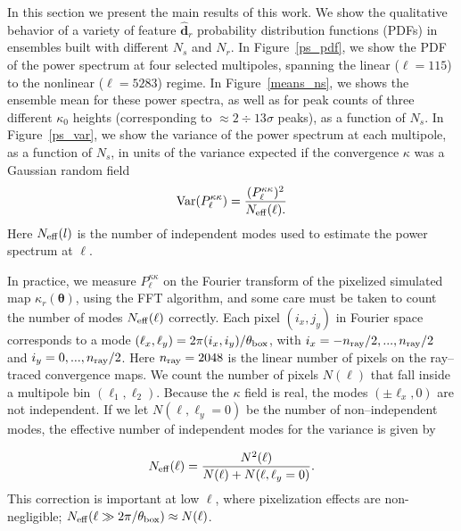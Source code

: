 \documentclass[reprint,aps,prd,superscriptaddress,showkeys,showpacs]{revtex4-1}
\newcommand{\bbh}[1]{\mathbf{\hat{#1}}}
\begin{document}

In this section we present the main results of this work. We show the
qualitative behavior of a variety of feature $\bbh{d}_r$ probability
distribution functions (PDFs) in ensembles built with different $N_s$
and $N_r$. In Figure~\ref{ps_pdf}, we show the PDF of the power
spectrum at four selected multipoles, spanning the linear ($\ell=115$)
to the nonlinear ($\ell=5283$) regime. In Figure~\ref{means_ns}, we
shows the ensemble mean for these power spectra, as well as for peak
counts of three different $\kappa_0$ heights (corresponding to
$\approx 2\div13\sigma$ peaks), as a function of $N_s$.
In Figure~\ref{ps_var}, we show the variance of the power spectrum at
each multipole, as a function of $N_s$, in units of the variance
expected if the convergence $\kappa$ was a Gaussian random field
%
\begin{equation}
\label{gaussianvar}
\mathrm{Var}(P^{\kappa\kappa}_\ell) = \frac{(P^{\kappa\kappa}_\ell)^2}{N_{\rm eff}(\ell).}
\end{equation}
%
Here $N_{\rm eff}(l)$ is the number of independent modes used to
estimate the power spectrum at $\ell$.  

In practice, we measure $P^{\kappa\kappa}_\ell$ on the Fourier
transform of the pixelized simulated map $\kappa_r(\pmb{\theta})$,
using the FFT algorithm, and some care must be taken to count the
number of modes $N_{\rm eff}(\ell)$ correctly. Each pixel $(i_x,j_y)$
in Fourier space corresponds to a mode
$(\ell_x,\ell_y)=2\pi(i_x,i_y)/\theta_{\rm box}$, with $i_x=-n_{\rm
  ray}/2,...,n_{\rm ray}/2$ and $i_y=0,...,n_{\rm ray}/2$.
Here $n_{\rm ray}=2048$ is the linear number of pixels on the
ray--traced convergence maps.  We count the number of pixels $N(\ell)$
that fall inside a multipole bin $(\ell_1,\ell_2)$. Because the
$\kappa$ field is real, the modes $(\pm \ell_x,0)$ are not
independent. If we let $N(\ell,\ell_y=0)$ be the number of
non--independent modes, the effective number of independent modes
for the variance is given by

\begin{equation}
N_{\rm eff}(\ell) = \frac{N^2(\ell)}{N(\ell)+N(\ell,\ell_y=0)}.
\end{equation}
%
This correction is important at low $\ell$, where pixelization effects
are non-negligible; $N_{\rm eff}(\ell\gg2\pi/\theta_{\rm box})\approx
N(\ell)$.
\end{document}
